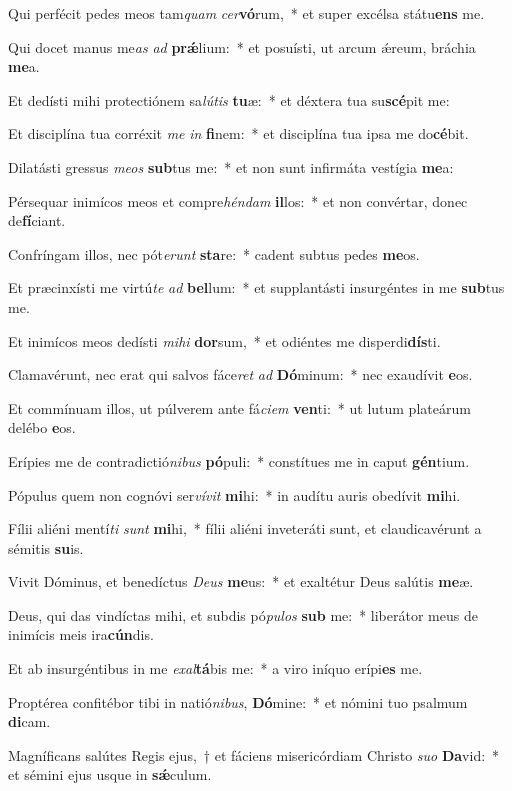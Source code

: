 \item Qui perfécit pedes meos tam\textit{quam} \textit{cer}\textbf{vó}rum,~* et super excélsa státu\textbf{ens} me.
\item Qui docet manus me\textit{as} \textit{ad} \textbf{prǽ}lium:~* et posuísti, ut arcum ǽreum, bráchia \textbf{me}a.
\item Et dedísti mihi protectiónem sa\textit{lú}\textit{tis} \textbf{tu}æ:~* et déxtera tua su\textbf{scé}pit me:
\item Et disciplína tua corréxit \textit{me} \textit{in} \textbf{fi}nem:~* et disciplína tua ipsa me do\textbf{cé}bit.
\item Dilatásti gressus \textit{me}\textit{os} \textbf{sub}tus me:~* et non sunt infirmáta vestígia \textbf{me}a:
\item Pérsequar inimícos meos et compre\textit{hén}\textit{dam} \textbf{il}los:~* et non convértar, donec de\textbf{fí}ciant.
\item Confríngam illos, nec pót\textit{e}\textit{runt} \textbf{sta}re:~* cadent subtus pedes \textbf{me}os.
\item Et præcinxísti me virtú\textit{te} \textit{ad} \textbf{bel}lum:~* et supplantásti insurgéntes in me \textbf{sub}tus me.
\item Et inimícos meos dedísti \textit{mi}\textit{hi} \textbf{dor}sum,~* et odiéntes me disperdi\textbf{dís}ti.
\item Clamavérunt, nec erat qui salvos fáce\textit{ret} \textit{ad} \textbf{Dó}minum:~* nec exaudívit \textbf{e}os.
\item Et commínuam illos, ut púlverem ante fá\textit{ci}\textit{em} \textbf{ven}ti:~* ut lutum plateárum delébo \textbf{e}os.
\item Erípies me de contradictió\textit{ni}\textit{bus} \textbf{pó}puli:~* constítues me in caput \textbf{gén}tium.
\item Pópulus quem non cognóvi ser\textit{ví}\textit{vit} \textbf{mi}hi:~* in audítu auris obedívit \textbf{mi}hi.
\item Fílii aliéni mentí\textit{ti} \textit{sunt} \textbf{mi}hi,~* fílii aliéni inveteráti sunt, et claudicavérunt a sémitis \textbf{su}is.
\item Vivit Dóminus, et benedíctus \textit{De}\textit{us} \textbf{me}us:~* et exaltétur Deus salútis \textbf{me}æ.
\item Deus, qui das vindíctas mihi, et subdis pó\textit{pu}\textit{los} \textbf{sub} me:~* liberátor meus de inimícis meis ira\textbf{cún}dis.
\item Et ab insurgéntibus in me \textit{ex}\textit{al}\textbf{tá}bis me:~* a viro iníquo erípi\textbf{es} me.
\item Proptérea confitébor tibi in natió\textit{ni}\textit{bus}, \textbf{Dó}mine:~* et nómini tuo psalmum \textbf{di}cam.
\item Magníficans salútes Regis ejus,~† et fáciens misericórdiam Christo \textit{su}\textit{o} \textbf{Da}vid:~* et sémini ejus usque in \textbf{sǽ}culum.
